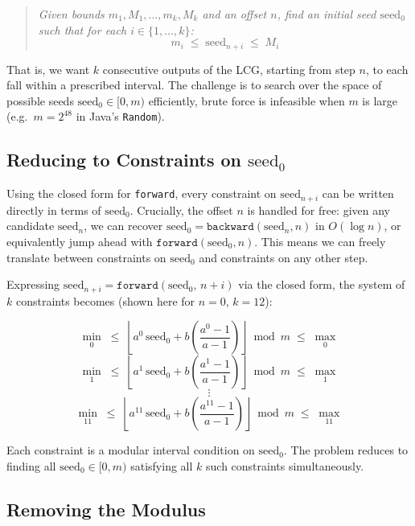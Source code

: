 \documentclass[11pt]{article}
\theoremstyle{plain}
\theoremstyle{definition}
\begin{document}
\begin{quote}
    \textit{Given bounds $m_1, M_1, \ldots, m_k, M_k$ and an offset $n$, find an initial seed
    $\text{seed}_0$ such that for each $i \in \{1, \ldots, k\}$:}
    \[
        m_i \;\leq\; \text{seed}_{n+i} \;\leq\; M_i
    \]
\end{quote}

That is, we want $k$ consecutive outputs of the LCG, starting from step $n$, to each fall within
a prescribed interval. The challenge is to search over the space of possible seeds $\text{seed}_0
\in [0, m)$ efficiently, brute force is infeasible when $m$ is large (e.g.\ $m = 2^{48}$ in
Java's \texttt{Random}).

\subsection{Reducing to Constraints on $\text{seed}_0$}

Using the closed form for \texttt{forward}, every constraint on $\text{seed}_{n+i}$ can be written
directly in terms of $\text{seed}_0$. Crucially, the offset $n$ is handled for free: given any
candidate $\text{seed}_n$, we can recover $\text{seed}_0 = \texttt{backward}(\text{seed}_n, n)$
in $O(\log n)$, or equivalently jump ahead with $\texttt{forward}(\text{seed}_0, n)$. This means
we can freely translate between constraints on $\text{seed}_0$ and constraints on any other step.

Expressing $\text{seed}_{n+i} = \texttt{forward}(\text{seed}_0,\, n+i)$ via the closed form,
the system of $k$ constraints becomes (shown here for $n = 0$, $k = 12$):

\[
\min_0 \;\leq\; \left\lfloor a^0\,\text{seed}_0 + b\!\left(\frac{a^0 - 1}{a-1}\right) \right\rfloor \bmod m \;\leq\; \max_0
\]
\[
\min_1 \;\leq\; \left\lfloor a^1\,\text{seed}_0 + b\!\left(\frac{a^1 - 1}{a-1}\right) \right\rfloor \bmod m \;\leq\; \max_1
\]
\[
\vdots
\]
\[
\min_{11} \;\leq\; \left\lfloor a^{11}\,\text{seed}_0 + b\!\left(\frac{a^{11} - 1}{a-1}\right) \right\rfloor \bmod m \;\leq\; \max_{11}
\]

Each constraint is a modular interval condition on $\text{seed}_0$. The problem reduces to finding
all $\text{seed}_0 \in [0, m)$ satisfying all $k$ such constraints simultaneously.

\subsection{Removing the Modulus}
\end{document}
